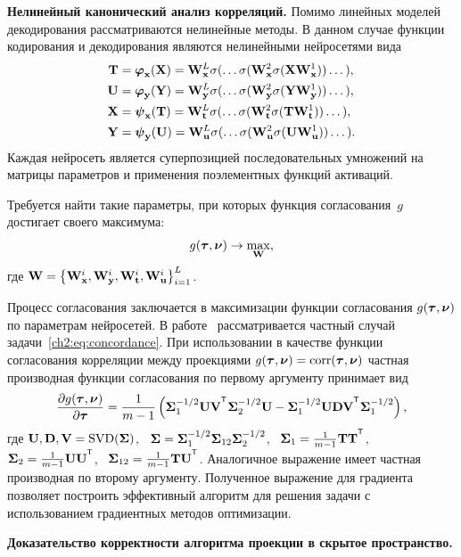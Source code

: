 \documentclass[11pt, a5paper]{dissert}
\begin{document}
\textbf{Нелинейный канонический анализ корреляций.}
Помимо линейных моделей декодирования рассматриваются нелинейные методы. 
В данном случае функции кодирования и декодирования являются нелинейными нейросетями вида
\begin{align*}
	\mathbf{T} &= \boldsymbol{\varphi}_{\mathbf{x}}(\mathbf{X}) =  \mathbf{W}_{\mathbf{x}}^L \sigma(\dots \sigma(\mathbf{W}_{\mathbf{x}}^2 \sigma(\mathbf{X} \mathbf{W}_{\mathbf{x}}^1)) \dots ), \\
	\mathbf{U} &= \boldsymbol{\varphi}_{\mathbf{y}}(\mathbf{Y}) =  \mathbf{W}_{\mathbf{y}}^L \sigma(\dots \sigma(\mathbf{W}_{\mathbf{y}}^2 \sigma(\mathbf{Y} \mathbf{W}_{\mathbf{y}}^1)) \dots ), \\
	\mathbf{X} &= \boldsymbol{\psi}_{\mathbf{x}}(\mathbf{T}) =  \mathbf{W}_{\mathbf{t}}^L \sigma(\dots \sigma(\mathbf{W}_{\mathbf{t}}^2 \sigma(\mathbf{T} \mathbf{W}_{\mathbf{t}}^1)) \dots ), \\
	\mathbf{Y} &= \boldsymbol{\psi}_{\mathbf{y}}(\mathbf{U}) =  \mathbf{W}_{\mathbf{u}}^L \sigma(\dots \sigma(\mathbf{W}_{\mathbf{u}}^2 \sigma(\mathbf{U} \mathbf{W}_{\mathbf{u}}^1)) \dots ).
\end{align*}
Каждая нейросеть является суперпозицией последовательных умножений на матрицы параметров и применения поэлементных функций активаций.

Требуется найти такие параметры, при которых функция согласования~$g$ достигает своего максимума:
\begin{equation}
	g(\boldsymbol{\tau}, \boldsymbol{\nu}) \rightarrow \max_{\mathbf{W}},
	\label{ch2:eq:concordance}
\end{equation}
где $\mathbf{W} = \bigl\{\mathbf{W}_{\mathbf{x}}^i, \mathbf{W}_{\mathbf{y}}^i, \mathbf{W}_{\mathbf{t}}^i, \mathbf{W}_{\mathbf{u}}^i\bigr\}_{i=1}^L$.

Процесс согласования заключается в максимизации функции согласования $g(\boldsymbol{\tau}, \boldsymbol{\nu})$ по параметрам нейросетей.
В работе~\cite{andrew2013deep} рассматривается частный случай задачи~\eqref{ch2:eq:concordance}. 
При использовании в качестве функции согласования корреляции между проекциями $g(\boldsymbol{\tau}, \boldsymbol{\nu}) = \textnormal{corr}(\boldsymbol{\tau}, \boldsymbol{\nu})$ частная производная функции согласования по первому аргументу принимает вид
\[
	\frac{\partial g(\btau, \bnu)}{\partial \btau} = \frac{1}{m - 1} \left(\bSigma_1^{-1/2} \bU \bV^{\T} \bSigma_2^{-1/2} \bU - \bSigma_1^{-1/2} \bU \bD \bV^{\T} \bSigma_1^{-1/2} \right),
\]
где $\mathbf{U}, \mathbf{D}, \mathbf{V} = \textnormal{SVD}(\boldsymbol{\Sigma})$, \, $\boldsymbol{\Sigma} = \boldsymbol{\Sigma}_1^{-1/2} \boldsymbol{\Sigma}_{12} \boldsymbol{\Sigma}_2^{-1/2} $, \, $\bSigma_1 = \frac{1}{m - 1} \bT \bT^{\T}$, \, $\bSigma_2 = \frac{1}{m - 1} \bU \bU^{\T}$, \, $\bSigma_{12} = \frac{1}{m - 1} \bT \bU^{\T}$.
Аналогичное выражение имеет частная производная по второму аргументу.
Полученное выражение для градиента позволяет построить эффективный алгоритм для решения задачи с использованием градиентных методов оптимизации.

\textbf{Доказательство корректности алгоритма проекции в скрытое пространство.}
\label{sec:ch2:pls_proof}
\end{document}
